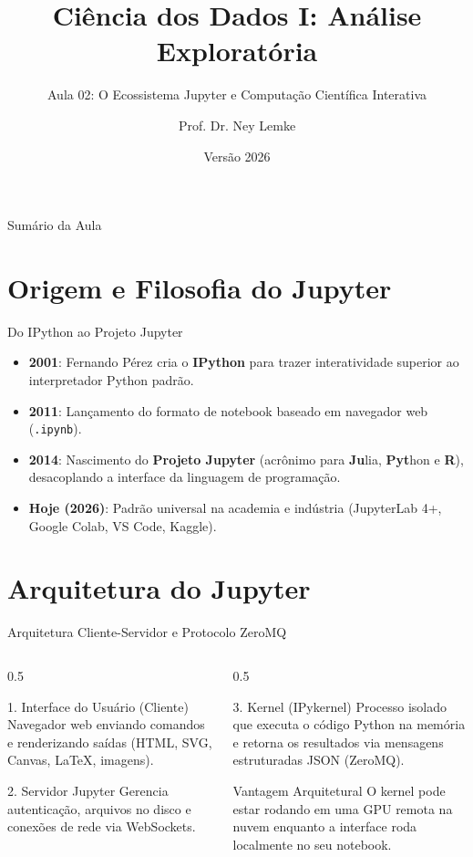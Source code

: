 \documentclass[aspectratio=169, 10pt]{beamer}
\title[Aula 02 - Ecossistema Jupyter]{Ciência dos Dados I: Análise Exploratória}
\subtitle{Aula 02: O Ecossistema Jupyter e Computação Científica Interativa}
\author{Prof. Dr. Ney Lemke}
\institute{UNESP -- Instituto de Biociências de Botucatu}
\date{Versão 2026}
\begin{document}
\frame{\titlepage}

\begin{frame}{Sumário da Aula}
  \tableofcontents
\end{frame}

\section{Origem e Filosofia do Jupyter}

\begin{frame}{Do IPython ao Projeto Jupyter}
  \begin{itemize}
    \item \textbf{2001}: Fernando Pérez cria o \textbf{IPython} para trazer interatividade superior ao interpretador Python padrão.
    \item \textbf{2011}: Lançamento do formato de notebook baseado em navegador web (\texttt{.ipynb}).
    \item \textbf{2014}: Nascimento do \textbf{Projeto Jupyter} (acrônimo para \textbf{Ju}lia, \textbf{Pyt}hon e \textbf{R}), desacoplando a interface da linguagem de programação.
    \item \textbf{Hoje (2026)}: Padrão universal na academia e indústria (JupyterLab 4+, Google Colab, VS Code, Kaggle).
  \end{itemize}
\end{frame}

\section{Arquitetura do Jupyter}

\begin{frame}{Arquitetura Cliente-Servidor e Protocolo ZeroMQ}
  \begin{columns}
    \begin{column}{0.5\textwidth}
      \begin{block}{1. Interface do Usuário (Cliente)}
        Navegador web enviando comandos e renderizando saídas (HTML, SVG, Canvas, LaTeX, imagens).
      \end{block}
      \begin{block}{2. Servidor Jupyter}
        Gerencia autenticação, arquivos no disco e conexões de rede via WebSockets.
      \end{block}
    \end{column}
    \begin{column}{0.5\textwidth}
      \begin{block}{3. Kernel (IPykernel)}
        Processo isolado que executa o código Python na memória e retorna os resultados via mensagens estruturadas JSON (ZeroMQ).
      \end{block}
      \begin{block}{Vantagem Arquitetural}
        O kernel pode estar rodando em uma GPU remota na nuvem enquanto a interface roda localmente no seu notebook.
      \end{block}
    \end{column}
  \end{columns}
\end{frame}
\end{document}
